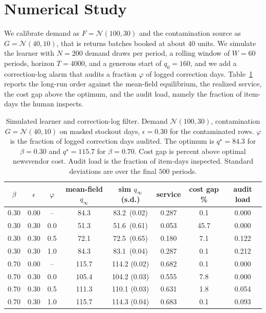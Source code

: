 \documentclass[11pt]{article}
\theoremstyle{plain}
\begin{document}
\section{Numerical Study}\label{sec:num}

We calibrate demand as $F=\mathcal N(100,30)$ and the contamination source as
$G=\mathcal N(40,10)$, that is returns batches booked at about $40$ units. We
simulate the learner with $N=200$ demand draws per period, a rolling window of
$W=60$ periods, horizon $T=4000$, and a generous start of $q_0=160$, and we add a
correction-log alarm that audits a fraction $\varphi$ of logged correction days.
Table~\ref{tab:sim} reports the long-run order against the mean-field equilibrium,
the realized service, the cost gap above the optimum, and the audit load, namely
the fraction of item-days the human inspects.

\begin{table}[t]
\centering
\small
\caption{Simulated learner and correction-log filter. Demand $\mathcal N(100,30)$,
contamination $G=\mathcal N(40,10)$ on masked stockout days, $\epsilon=0.30$ for the
contaminated rows. $\varphi$ is the fraction of logged correction days audited. The
optimum is $q^\star=84.3$ for $\beta=0.30$ and $q^\star=115.7$ for $\beta=0.70$.
Cost gap is percent above optimal newsvendor cost. Audit load is the fraction of
item-days inspected. Standard deviations are over the final $500$ periods.}
\label{tab:sim}
\begin{tabular}{c c c c c c c c}
\toprule
$\beta$ & $\epsilon$ & $\varphi$ & mean-field $q_\infty$ & sim $q_\infty$ (s.d.)
 & service & cost gap \% & audit load\\
\midrule
0.30 & 0.00 & --  & 84.3 & 83.2 \,(0.02) & 0.287 & 0.1  & 0.000\\
0.30 & 0.30 & 0.0 & 51.3 & 51.6 \,(0.61) & 0.053 & 45.7 & 0.000\\
0.30 & 0.30 & 0.5 & 72.1 & 72.5 \,(0.65) & 0.180 & 7.1  & 0.122\\
0.30 & 0.30 & 1.0 & 84.3 & 83.1 \,(0.04) & 0.287 & 0.1  & 0.212\\
\midrule
0.70 & 0.00 & --  & 115.7 & 114.2 (0.02) & 0.682 & 0.1  & 0.000\\
0.70 & 0.30 & 0.0 & 105.4 & 104.2 (0.03) & 0.555 & 7.8  & 0.000\\
0.70 & 0.30 & 0.5 & 111.3 & 110.1 (0.03) & 0.631 & 1.8  & 0.054\\
0.70 & 0.30 & 1.0 & 115.7 & 114.3 (0.04) & 0.683 & 0.1  & 0.093\\
\bottomrule
\end{tabular}
\end{table}
\end{document}
